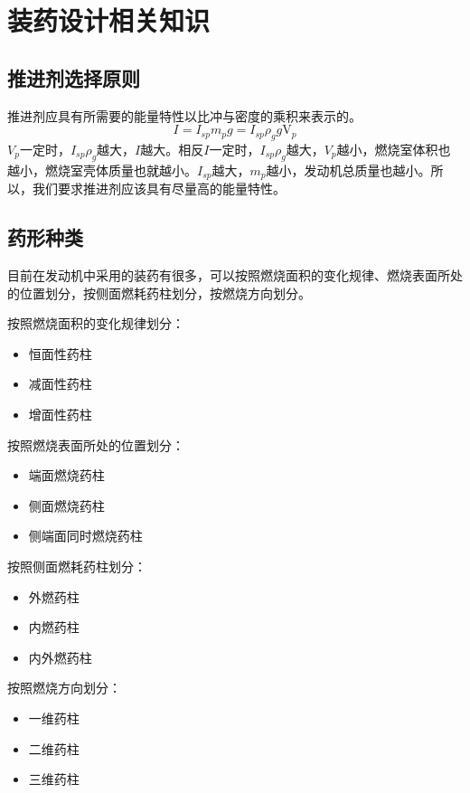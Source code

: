 
\chapter{装药设计相关知识}

\section{推进剂选择原则}

推进剂应具有所需要的能量特性以比冲与密度的乘积来表示的。
\[
    I=I_{sp}m_pg=I_{sp}\rho _gg\mathrm{V}_p
\]
$V_{p}$一定时，$I_{sp}\rho _g$越大，$I$越大。相反$I$一定时，$I_{sp}\rho _g$越大，$V_{p}$越小，燃烧室体积也越小，燃烧室壳体质量也就越小。$I_{sp}$越大，$m_{p}$越小，发动机总质量也越小。所以，我们要求推进剂应该具有尽量高的能量特性。

\section{药形种类}

目前在发动机中采用的装药有很多，可以按照燃烧面积的变化规律、燃烧表面所处的位置划分，按侧面燃耗药柱划分，按燃烧方向划分。

按照燃烧面积的变化规律划分：
\begin{itemize}[leftmargin=2em]
    \item 恒面性药柱
    \item 减面性药柱
    \item 增面性药柱
\end{itemize}

按照燃烧表面所处的位置划分：
\begin{itemize}[leftmargin=2em]
    \item 端面燃烧药柱
    \item 侧面燃烧药柱
    \item 侧端面同时燃烧药柱
\end{itemize}

按照侧面燃耗药柱划分：
\begin{itemize}[leftmargin=2em]
    \item 外燃药柱
    \item 内燃药柱
    \item 内外燃药柱
\end{itemize}

按照燃烧方向划分：
\begin{itemize}[leftmargin=2em]
    \item 一维药柱
    \item 二维药柱
    \item 三维药柱
\end{itemize}

